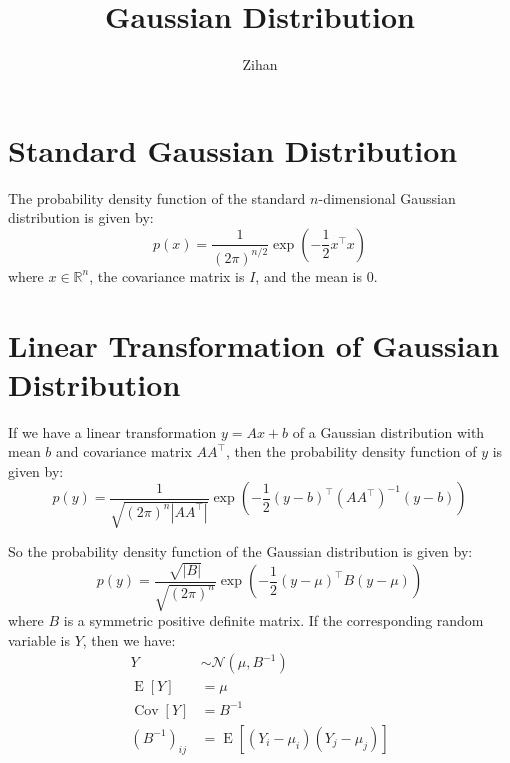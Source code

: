 \documentclass[12pt]{article}
\title{Gaussian Distribution}
\author{Zihan}
\begin{document}
\maketitle

\section{Standard Gaussian Distribution}
The probability density function of the standard $n$-dimensional Gaussian distribution is given by:
\begin{equation}
    p(x)=\frac{1}{(2\pi)^{n/2}}\exp\left(-\frac{1}{2}x^{\top}x\right)
\end{equation}
where $x\in\mathbb{R}^n$, the covariance matrix is $I$, and the mean is $0$.

\section{Linear Transformation of Gaussian Distribution}
If we have a linear transformation $y=Ax+b$ of a Gaussian distribution with mean $b$ and covariance matrix $AA^{\top}$, then the probability density function of $y$ is given by:
\begin{equation}
    p(y)=\frac{1}{\sqrt{(2\pi)^n|AA^{\top}|}}\exp\left(-\frac{1}{2}(y-b)^{\top}(AA^{\top})^{-1}(y-b)\right)
\end{equation}


So the probability density function of the Gaussian distribution is given by:
\begin{equation}
    p(y)=\frac{\sqrt{|B|}}{\sqrt{(2\pi)^n}}\exp\left(-\frac{1}{2}(y-\mu)^{\top}B(y-\mu)\right)
\end{equation}
where $B$ is a symmetric positive definite matrix. If the corresponding random variable is $Y$, then we have:
\begin{align}
    Y                     & \sim\mathcal{N}(\mu, B^{-1})              \\
    \operatorname{E}[Y]   & =\mu                                      \\
    \operatorname{Cov}[Y] & =B^{-1}                                   \\
    (B^{-1})_{ij}         & =\operatorname{E}[(Y_i-\mu_i)(Y_j-\mu_j)]
\end{align}
\end{document}

